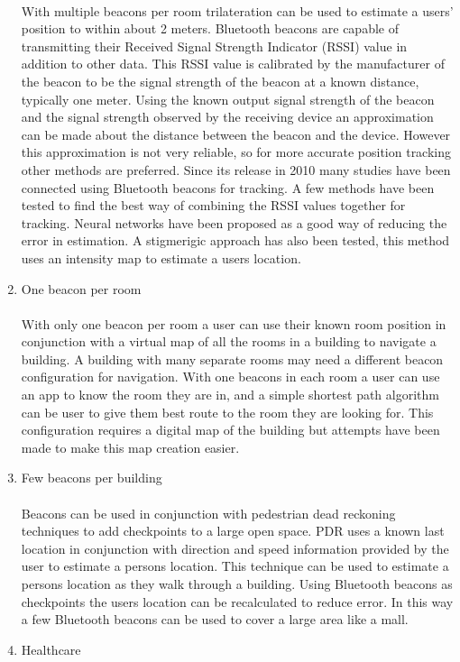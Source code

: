 \documentclass[a4paper,12pt]{report}
\begin{document}
\begin{enumerate}
	\paragraph{}With multiple beacons per room trilateration can be used to estimate a users' position to within about 2 meters. Bluetooth beacons are capable of transmitting their Received Signal Strength Indicator (RSSI) value in addition to other data. This RSSI value is calibrated by the manufacturer of the beacon to be the signal strength of the beacon at a known distance, typically one meter. Using the known output signal strength of the beacon and the signal strength observed by the receiving device an approximation can be made about the distance between the beacon and the device. However this approximation is not very reliable, so for more accurate position tracking other methods are preferred. Since its release in 2010 many studies have been connected using Bluetooth beacons for tracking. A few methods have been tested to find the best way of combining the RSSI values together for tracking. Neural networks have been proposed as a good way of reducing the error in estimation. A stigmerigic approach has also been tested, this method uses an intensity map to estimate a users location.
	\newpage
	\item One beacon per room
	\paragraph{}With only one beacon per room a user can use their known room position in conjunction with a virtual map of all the rooms in a building to navigate a building. A building with many separate rooms may need a different beacon configuration for navigation. With one beacons in each room a user can use an app to know the room they are in, and a simple shortest path algorithm can be user to give them best route to the room they are looking for. This configuration requires a digital map of the building but attempts have been made to make this map creation easier.
	\item Few beacons per building
	\paragraph{}Beacons can be used in conjunction with pedestrian dead reckoning  techniques to add checkpoints to a large open space. PDR uses a known last location in conjunction with direction and speed information provided by the user to estimate a persons location. This technique can be used to estimate a persons location as they walk through a building. Using Bluetooth beacons as checkpoints the users location can be recalculated to reduce error. In this way a few Bluetooth beacons can be used to cover a large area like a mall.
	\item Healthcare

\end{enumerate}
\end{document}
